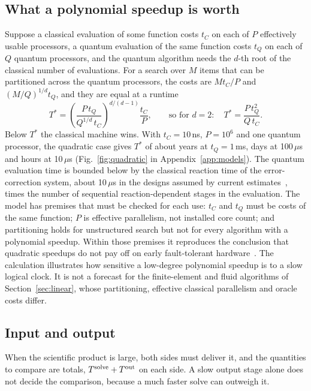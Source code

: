 \documentclass[10pt,a4paper]{article}
\begin{document}
\subsection{What a polynomial speedup is worth}
\label{sec:breakeven}
Suppose a classical evaluation of some function costs $t_C$ on each of $P$ effectively usable processors, a quantum evaluation of the same function costs $t_Q$ on each of $Q$ quantum processors, and the quantum algorithm needs the $d$-th root of the classical number of evaluations. For a search over $M$ items that can be partitioned across the quantum processors, the costs are $Mt_C/P$ and $(M/Q)^{1/d}t_Q$, and they are equal at a runtime
\begin{equation}
T^*=\left(\frac{P\,t_Q}{Q^{1/d}\,t_C}\right)^{\!d/(d-1)}\frac{t_C}{P},\qquad\text{so for } d=2:\quad T^*=\frac{P\,t_Q^2}{Q\,t_C}.
\label{eq:tstar}
\end{equation}
Below $T^*$ the classical machine wins. With $t_C=10$\,ns, $P=10^6$ and one quantum processor, the quadratic case gives $T^*$ of about \beYms{} years at $t_Q=1$\,ms, \beDhundred{} days at 100\,$\mu$s and \beHten{} hours at 10\,$\mu$s (Fig.~\ref{fig:quadratic} in Appendix~\ref{app:models}). The quantum evaluation time is bounded below by the classical reaction time of the error-correction system, about 10\,$\mu$s in the designs assumed by current estimates~\cite{low2026dense}, times the number of sequential reaction-dependent stages in the evaluation. The model has premises that must be checked for each use: $t_C$ and $t_Q$ must be costs of the same function; $P$ is effective parallelism, not installed core count; and partitioning holds for unstructured search but not for every algorithm with a polynomial speedup. Within those premises it reproduces the conclusion that quadratic speedups do not pay off on early fault-tolerant hardware~\cite{babbush2021,hoefler2023}. The calculation illustrates how sensitive a low-degree polynomial speedup is to a slow logical clock. It is not a forecast for the finite-element and fluid algorithms of Section~\ref{sec:linear}, whose partitioning, effective classical parallelism and oracle costs differ.

\subsection{Input and output}
\label{sec:output}
When the scientific product is large, both sides must deliver it, and the quantities to compare are totals, $T^{\rm solve}+T^{\rm out}$ on each side. A slow output stage alone does not decide the comparison, because a much faster solve can outweigh it.
\end{document}
